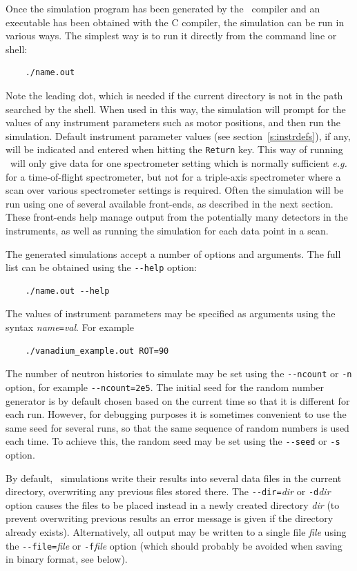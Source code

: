 Once the simulation program has been generated by the \MCS\ compiler
and an executable has been obtained with the C compiler, the simulation
can be run in various ways. The simplest way is to run it directly from the
command line or shell:
\begin{verbatim}
    ./name.out
\end{verbatim}
Note the leading dot, which is needed if the current directory is not in
the path searched by the shell. When used in this way, the simulation
will prompt for the values of any instrument parameters such as motor
positions, and then run the simulation. Default instrument parameter values (see section~\ref{s:instrdefs}), if any, will be indicated and entered when hitting the \verb+Return+ key.
This way of running \MCS\ will only give data for one spectrometer
setting which is normally sufficient {\em e.g.} for a time-of-flight
spectrometer, but not for a triple-axis spectrometer where a scan over
various spectrometer settings is required.
Often the simulation will be run using one of several
available front-ends, as described in the next section. These front-ends
help manage output from the potentially many detectors in the
instruments, as well as running the simulation for each data point in
a scan.

The generated simulations accept a number of options and arguments. The
full list can be obtained using the \verb+--help+ option:
\begin{verbatim}
    ./name.out --help
\end{verbatim}
The values of instrument parameters may be specified as arguments using
the syntax \textit{name}\verb+=+\textit{val}. For example
\begin{verbatim}
    ./vanadium_example.out ROT=90
\end{verbatim}
The number of neutron histories to simulate may be set using the
\verb+--ncount+ or \verb+-n+ option, for example
\verb+--ncount=2e5+. The initial seed for the random number generator is
by default chosen based on the current time so that it is different for
each run. However, for debugging purposes it is sometimes convenient to
use the same seed for several runs, so that the same sequence of random
numbers is used each time. To achieve this, the random seed may be set
using the \verb+--seed+ or \verb+-s+ option.

By default, \MCS\ simulations write their results into several data files in the
current directory, overwriting any previous files stored there. The
\verb+--dir=+\textit{dir} or \verb+-d+\textit{dir} option causes the files to be
placed instead in a newly created directory \textit{dir} (to prevent overwriting
previous results an error message is given if the directory already exists).
Alternatively, all output may be written to a single file \textit{file} using
the \verb+--file=+\textit{file} or \verb+-f+\textit{file} option (which should probably be avoided when saving in binary format, see below).

